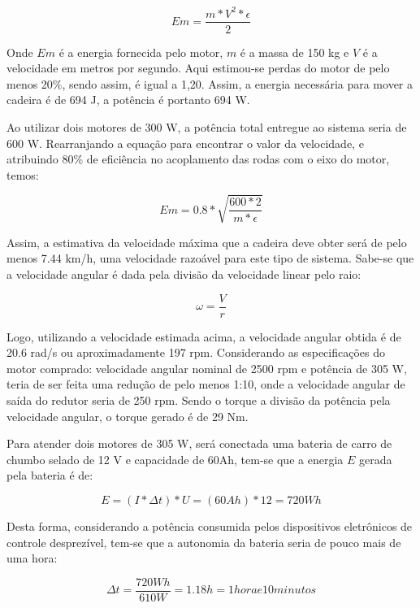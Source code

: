 \begin{equation}
Em = \frac{m*V^2*\epsilon}{2}
\end{equation}

Onde $Em$ é a energia fornecida pelo motor, $m$ é a massa de 150 kg e $V$ é a velocidade em metros por segundo. Aqui estimou-se perdas do motor de pelo menos 20\%, sendo assim, é igual a 1,20. Assim, a energia necessária para mover a cadeira é de 694 J, a potência é portanto 694 W.

Ao utilizar dois motores de 300 W, a potência total entregue ao sistema seria de 600 W. Rearranjando a equação para encontrar o valor da velocidade, e atribuindo 80\% de eficiência no acoplamento das rodas com o eixo do motor, temos:

\begin{equation}
Em = 0.8*\sqrt{\frac{600*2}{m*\epsilon}}
\end{equation}

Assim, a estimativa da velocidade máxima que a cadeira deve obter será de pelo menos 7.44 km/h, uma velocidade razoável para este tipo de sistema. Sabe-se que a velocidade angular é dada pela divisão da velocidade linear pelo raio:

\begin{equation}
\omega = \frac{V}{r}
\end{equation}

Logo, utilizando a velocidade estimada acima, a velocidade angular obtida é de 20.6 rad/s ou aproximadamente 197 rpm. Considerando as especificações do motor comprado: velocidade angular nominal de 2500 rpm e potência de 305 W, teria de ser feita uma redução de pelo menos 1:10, onde a velocidade angular de saída do redutor seria de 250 rpm. Sendo o torque a divisão da potência pela velocidade angular, o torque gerado é de 29 Nm.

Para atender dois motores de 305 W, será conectada uma bateria de carro de chumbo selado de 12 V e capacidade de 60Ah, tem-se que a energia $E$ gerada pela bateria é de:

\begin{equation}
E = (I*\Delta t)*U = (60Ah)*12 = 720Wh
\end{equation}

Desta forma, considerando a potência consumida pelos dispositivos eletrônicos de controle desprezível, tem-se que a autonomia da bateria seria de pouco mais de uma hora:

\begin{equation}
\Delta t = \frac{720 Wh}{610 W} = 1.18 h = 1 hora e 10 minutos
\end{equation}


